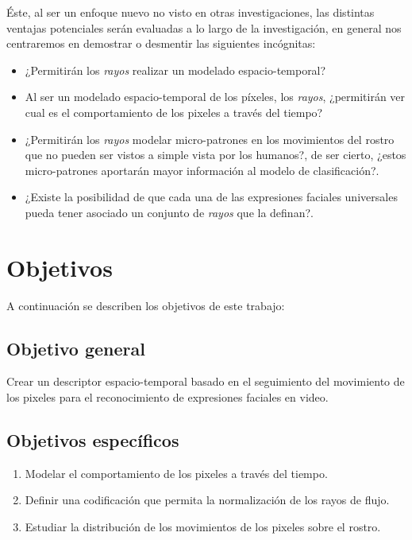 Éste, al ser un enfoque nuevo no visto en otras investigaciones, las distintas ventajas potenciales serán evaluadas a lo largo de la investigación, en general nos centraremos en demostrar o desmentir las siguientes incógnitas:

\begin{itemize}
	\item ¿Permitirán los \textit{rayos} realizar un modelado espacio-temporal?
	\item Al ser un modelado espacio-temporal de los píxeles, los \textit{rayos}, ¿permitirán ver cual es el comportamiento de los pixeles a través del tiempo?
	\item ¿Permitirán los \textit{rayos} modelar micro-patrones en los movimientos del rostro que no pueden ser vistos a simple vista por los humanos?, de ser cierto, ¿estos micro-patrones aportarán mayor información al modelo de clasificación?.
	\item ¿Existe la posibilidad de que cada una de las expresiones faciales universales pueda tener asociado un conjunto de \textit{rayos} que la definan?. 
\end{itemize}


\section{Objetivos}
\label{subsec:objetivos}
A continuación se describen los objetivos de este trabajo:

\subsection{Objetivo general}
\label{subsubsec:objgeneral}
Crear un descriptor espacio-temporal basado en el seguimiento del movimiento de los pixeles para el reconocimiento de expresiones faciales en video.


\subsection{Objetivos específicos}
\label{subsubsec:objgeneral}
	\begin{enumerate}
		\item Modelar el comportamiento de los pixeles a través del tiempo.
		\item Definir una codificación que permita la normalización de los rayos de flujo.
		\item Estudiar la distribución de los movimientos de los pixeles sobre el rostro.
	\end{enumerate}